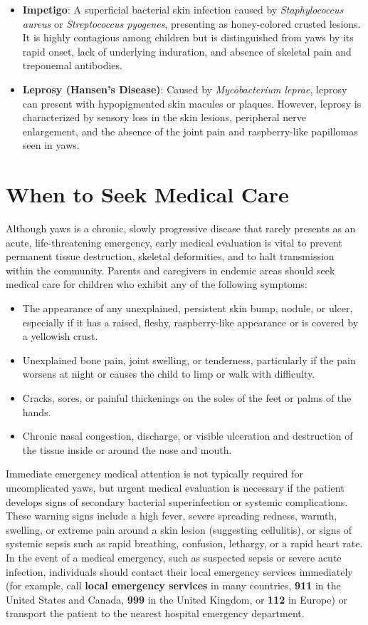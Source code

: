 \begin{itemize}
    \item \textbf{Impetigo}: A superficial bacterial skin infection caused by \textit{Staphylococcus aureus} or \textit{Streptococcus pyogenes}, presenting as honey-colored crusted lesions. It is highly contagious among children but is distinguished from yaws by its rapid onset, lack of underlying induration, and absence of skeletal pain and treponemal antibodies.
    \item \textbf{Leprosy (Hansen's Disease)}: Caused by \textit{Mycobacterium leprae}, leprosy can present with hypopigmented skin macules or plaques. However, leprosy is characterized by sensory loss in the skin lesions, peripheral nerve enlargement, and the absence of the joint pain and raspberry-like papillomas seen in yaws.
\end{itemize}

\section*{When to Seek Medical Care}
Although yaws is a chronic, slowly progressive disease that rarely presents as an acute, life-threatening emergency, early medical evaluation is vital to prevent permanent tissue destruction, skeletal deformities, and to halt transmission within the community. Parents and caregivers in endemic areas should seek medical care for children who exhibit any of the following symptoms:
\begin{itemize}
    \item The appearance of any unexplained, persistent skin bump, nodule, or ulcer, especially if it has a raised, fleshy, raspberry-like appearance or is covered by a yellowish crust.
    \item Unexplained bone pain, joint swelling, or tenderness, particularly if the pain worsens at night or causes the child to limp or walk with difficulty.
    \item Cracks, sores, or painful thickenings on the soles of the feet or palms of the hands.
    \item Chronic nasal congestion, discharge, or visible ulceration and destruction of the tissue inside or around the nose and mouth.
\end{itemize}

Immediate emergency medical attention is not typically required for uncomplicated yaws, but urgent medical evaluation is necessary if the patient develops signs of secondary bacterial superinfection or systemic complications. These warning signs include a high fever, severe spreading redness, warmth, swelling, or extreme pain around a skin lesion (suggesting cellulitis), or signs of systemic sepsis such as rapid breathing, confusion, lethargy, or a rapid heart rate. In the event of a medical emergency, such as suspected sepsis or severe acute infection, individuals should contact their local emergency services immediately (for example, call \textbf{local emergency services} in many countries, \textbf{911} in the United States and Canada, \textbf{999} in the United Kingdom, or \textbf{112} in Europe) or transport the patient to the nearest hospital emergency department.

